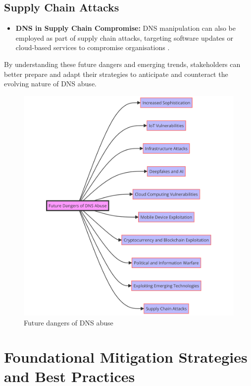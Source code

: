 \subsection{Supply Chain Attacks}
\begin{itemize}
    \item \textbf{DNS in Supply Chain Compromise:} DNS manipulation can also be employed as part of supply chain attacks, targeting software updates or cloud-based services to compromise organisations \cite{boyson2014cyber}.
\end{itemize}

By understanding these future dangers and emerging trends, stakeholders can better prepare and adapt their strategies to anticipate and counteract the evolving nature of DNS abuse.


\captionsetup{font= footnotesize}
\begin{figure}[H]
\centering
\includegraphics[width=1.2\textwidth]{background/DNSfutureDanger.png}
\caption{Future dangers of DNS abuse}
\label{fig:figureFive}
\end{figure}
\newpage


\section{Foundational Mitigation Strategies and Best Practices }

